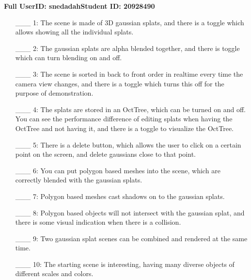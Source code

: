 \documentclass {article}
\begin{document}
\newpage



{\hfill{\bf Full UserID: snedadah}\hfill{\bf Student ID: 20928490}\hfill}

\begin{enumerate}
     \item[\_\_\_ 1:] The scene is made of 3D gaussian splats, and there is a toggle which allows showing all the individual splats.
     
     \item[\_\_\_ 2:] The gaussian splats are alpha blended together, and there is toggle which can turn blending on and off.

     \item[\_\_\_ 3:] The scene is sorted in back to front order in realtime every time the camera view changes, and there is a toggle which turns this off for the purpose of demonstration.

     \item[\_\_\_ 4:] The splats are stored in an OctTree, which can be turned on and off. You can see the performance difference of editing splats when having the OctTree and not having it, and there is a toggle to visualize the OctTree.

     \item[\_\_\_ 5:]  There is a delete button, which allows the user to click on a certain point on the screen, and delete gaussians close to that point.

     \item[\_\_\_ 6:] You can put polygon based meshes into the scene, which are correctly blended with the gaussian splats.

     \item[\_\_\_ 7:] Polygon based meshes cast shadows on to the gaussian splats.

     \item[\_\_\_ 8:] Polygon based objects will not intersect with the gaussian splat, and there is some visual indication when there is a collision.

     \item[\_\_\_ 9:]  Two gaussian splat scenes can be combined and rendered at the same time.

     \item[\_\_\_ 10:] The starting scene is interesting, having many diverse objects of different scales and colors.


\end{enumerate}

\end{document}
